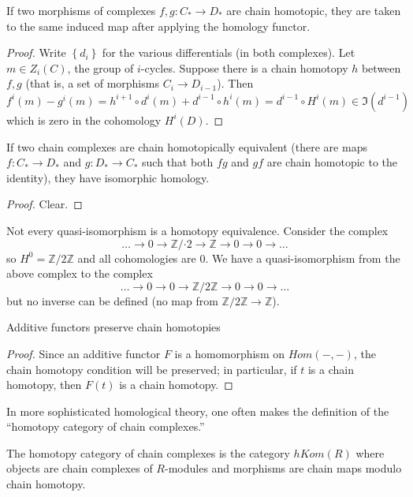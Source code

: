 \begin{proposition} If two morphisms of complexes $f,g: C_* \to D_*$ are chain homotopic, they are taken
to the same induced map after applying the homology functor.
\end{proposition}

\begin{proof} 
Write $\left\{d_i\right\}$ for the various differentials (in both complexes).
Let $m\in Z_i(C)$, the group of $i$-cycles. 
Suppose there is a chain homotopy $h$ between $f,g$ (that is, a set of
morphisms $C_i \to D_{i-1}$).
Then
$$f^i(m)-g^i(m)= h^{i+1}\circ d^i(m) + d^{i-1}\circ h^i(m)= d^{i-1}\circ H^i(m) \in \Im(d^{i-1})$$
which is zero in the cohomology $H^i(D)$. 
\end{proof}


\begin{corollary} If two chain complexes are chain homotopically equivalent
(there are maps $f: C_*\rightarrow D_*$ and $g:D_*\rightarrow
C_*$ such that both $fg$ and $gf$ are chain homotopic to the
identity), they have isomorphic homology.
\end{corollary}
\begin{proof} 
Clear.
\end{proof} 

\begin{example}  Not every quasi-isomorphism is a homotopy equivalence.  Consider the complex
$$\dots \rightarrow 0\rightarrow\mathbb{Z}/{\cdot 2}\rightarrow \mathbb{Z}\rightarrow 0\rightarrow 0\rightarrow\dots$$
so $H^0=\mathbb{Z}/2\mathbb{Z}$ and all cohomologies are 0.  We have a quasi-isomorphism from the above complex to the complex
$$\dots \rightarrow 0\rightarrow 0 \rightarrow \mathbb{Z}/2\mathbb{Z}\rightarrow 0\rightarrow 0\rightarrow\dots$$
but no inverse can be defined (no map from $\mathbb{Z}/2\mathbb{Z}\rightarrow \mathbb{Z}$).
\end{example}


\begin{proposition} Additive functors preserve chain homotopies
\end{proposition}
\begin{proof} Since an additive functor $F$ is a homomorphism on $Hom(-,-)$,
the chain homotopy condition will be preserved; in
particular, if $t$ is a chain homotopy, then $F(t)$ is a chain
homotopy.
\end{proof}

In more sophisticated homological theory, one often makes the
definition of the ``homotopy category of chain complexes.''
\begin{definition} The homotopy category of chain complexes is
the category $hKom(R)$ where objects are chain complexes of
$R$-modules and morphisms are chain maps modulo chain homotopy.
\end{definition}


